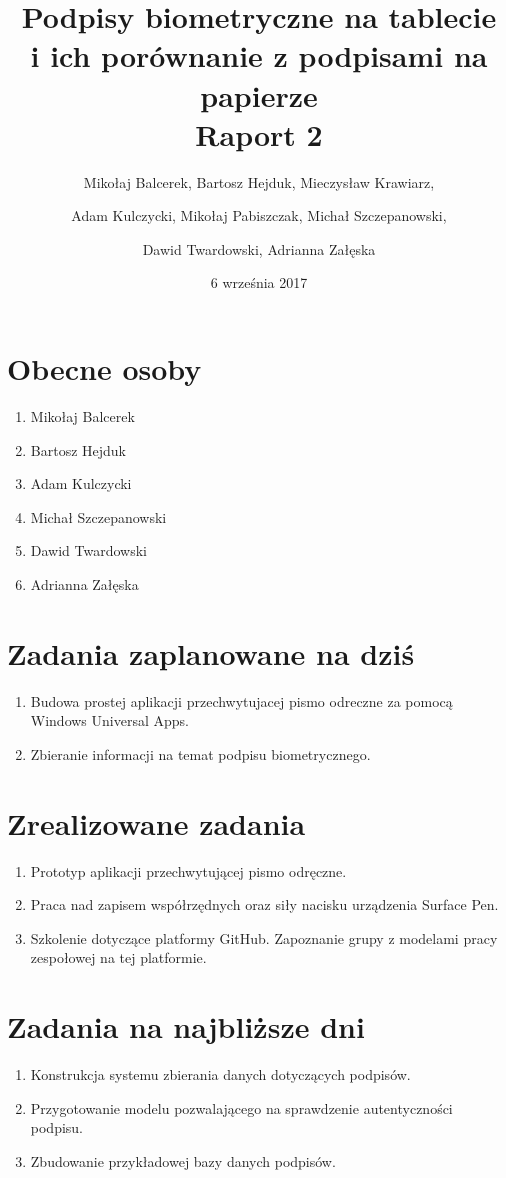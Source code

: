 \documentclass{mwrep}
\title{Podpisy biometryczne na tablecie \\ i ich porównanie z podpisami na papierze\\ 
Raport 2}
\author{Mikołaj Balcerek, Bartosz Hejduk, Mieczysław Krawiarz, \and Adam Kulczycki, Mikołaj Pabiszczak, Michał Szczepanowski, \and Dawid Twardowski, Adrianna Załęska}
\date{6 września 2017}
\begin{document}
\maketitle
{\let\clearpage\relax 
\chapter{Obecne osoby}}
\begin{enumerate}
    \item Mikołaj Balcerek
    \item Bartosz Hejduk
    \item Adam Kulczycki
    \item Michał Szczepanowski
    \item Dawid Twardowski
    \item Adrianna Załęska
\end{enumerate}


{\let\clearpage\relax 
\chapter{Zadania zaplanowane na dziś}}
\begin{enumerate}
	\item Budowa prostej aplikacji przechwytujacej pismo odreczne za pomocą \\ Windows
Universal Apps.
	\item Zbieranie informacji na temat podpisu biometrycznego.
\end{enumerate}


{\let\clearpage\relax 
\chapter{Zrealizowane zadania}}
\begin{enumerate}
	\item Prototyp aplikacji przechwytującej pismo odręczne.
	\item Praca nad zapisem współrzędnych oraz siły nacisku urządzenia Surface Pen.
	\item Szkolenie dotyczące platformy GitHub. Zapoznanie grupy z modelami pracy zespołowej 	na tej platformie.

\end{enumerate}

{\let\clearpage\relax \chapter{Zadania na najbliższe dni}}
\begin{enumerate}
    \item Konstrukcja systemu zbierania danych dotyczących podpisów.
    \item Przygotowanie modelu pozwalającego na sprawdzenie autentyczności \\ podpisu.
    \item Zbudowanie przykładowej bazy danych podpisów.
\end{enumerate}
\end{document}
